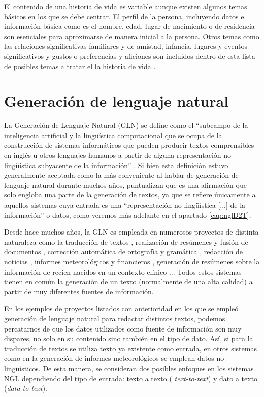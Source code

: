 El contenido de una historia de vida es variable aunque existen algunos temas básicos en los que se debe centrar. El perfil de la persona, incluyendo datos e información básica como es el nombre, edad, lugar de nacimiento o de residencia son esenciales para aproximarse de manera inicial a la persona. Otros temas como las relaciones significativas familiares y de amistad, infancia, lugares y eventos significativos y gustos o preferencias y aficiones son incluidos dentro de esta lista de posibles temas a tratar el la historia de vida \citep{dementiauk}.

\section{Generación de lenguaje natural}

La Generación de Lenguaje Natural (GLN) se define como el ``subcampo de la inteligencia artificial y la lingüística computacional que se ocupa de la construcción de sistemas informáticos que pueden producir textos comprensibles en inglés u otros lenguajes humanos a partir de alguna representación no lingüística subyacente de la información''  \citep{reiter1997building}. Si bien esta definición estuvo generalmente aceptada como la más conveniente al hablar de generación de lenguaje natural durante muchos años, \cite{gatt2018survey} puntualizan que es una afirmación que solo engloba una parte de la generación de textos, ya que se refiere únicamente a aquellos sistemas cuya entrada es una ``representación no lingüística [...] de la información'' o datos, como veremos más adelante en el apartado \ref{cap:nglD2T}.

Desde hace muchos años, la GLN es empleada en numerosos proyectos de distinta naturaleza como la traducción de textos \citep{Cho2014LearningPR}, realización de resúmenes y fusión de documentos \citep{clarke2010discourse}, corrección automática de ortografía y gramática \citep{islam2018bangla}, redacción de noticias \citep{leppanen2017data}, informes meteorológicos \citep{sripada2014case} y financieros \citep{ren2021hybrid}, generación de resúmenes sobre la información de recien nacidos en un contexto clínico \citep{BabyTalk}... Todos estos sistemas tienen en común la generación de un texto (normalmente de una alta calidad) a partir de muy diferentes fuentes de información.

En los ejemplos de proyectos listados con anterioridad en los que se empleó generación de lenguaje natural para redactar distintos textos, podemos percatarnos de que los datos utilizados como fuente de información son muy dispares, no solo en su contenido sino también en el tipo de dato. Así, si para la traducción de textos se utiliza texto ya existente como entrada, en otros sistemas como en la generación de informes meteorológicos se emplean datos no lingüísticos. De esta manera, se consideran dos posibles enfoques en los sistemas NGL dependiendo del tipo de entrada: texto a texto ( \textit{text-to-text}) y dato a texto (\textit{data-to-text}).


